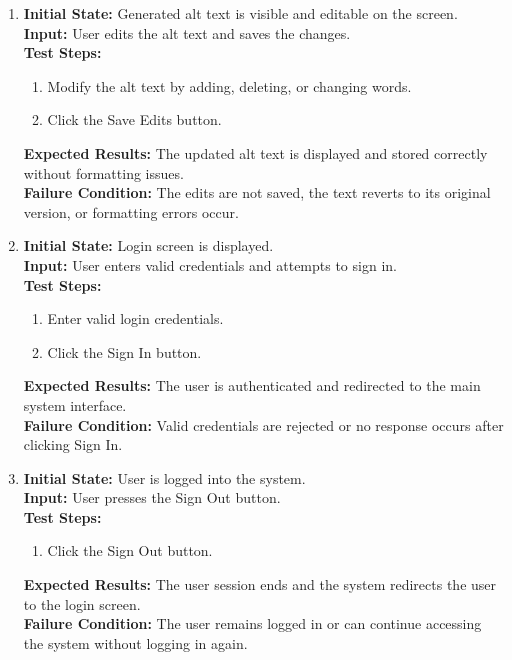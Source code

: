 \documentclass[12pt, titlepage]{article}
\begin{document}
\begin{enumerate}[label=UII-MT \arabic*., wide=0pt, leftmargin=*]
  \item{}
    {\bf Initial State:} Generated alt text is visible and editable
    on the screen. \\
    {\bf Input:} User edits the alt text and saves the changes. \\
    {\bf Test Steps:}
    \begin{enumerate}
      \item Modify the alt text by adding, deleting, or changing words.
      \item Click the Save Edits button.
    \end{enumerate}
    {\bf Expected Results:} The updated alt text is displayed and
    stored correctly without formatting issues. \\
    {\bf Failure Condition:} The edits are not saved, the text
    reverts to its original version, or formatting errors occur. \\
  \item{}
    {\bf Initial State:} Login screen is displayed. \\
    {\bf Input:} User enters valid credentials and attempts to sign in. \\
    {\bf Test Steps:}
    \begin{enumerate}
      \item Enter valid login credentials.
      \item Click the Sign In button.
    \end{enumerate}
    {\bf Expected Results:} The user is authenticated and redirected
    to the main system interface. \\
    {\bf Failure Condition:} Valid credentials are rejected or no
    response occurs after clicking Sign In. \\
  \item{}
    {\bf Initial State:} User is logged into the system. \\
    {\bf Input:} User presses the Sign Out button. \\
    {\bf Test Steps:}
    \begin{enumerate}
      \item Click the Sign Out button.
    \end{enumerate}
    {\bf Expected Results:} The user session ends and the system
    redirects the user to the login screen. \\
    {\bf Failure Condition:} The user remains logged in or can
    continue accessing the system without logging in again. \\
\end{enumerate}
\end{document}
